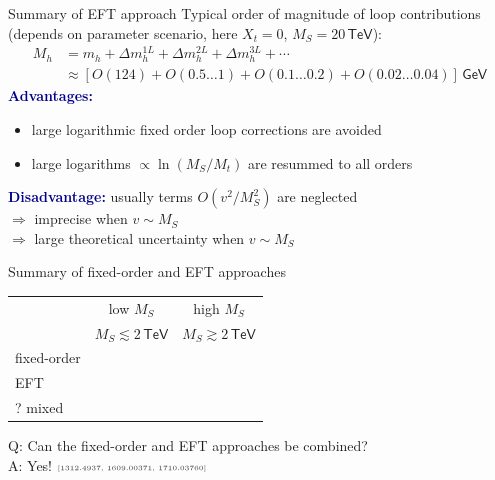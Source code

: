 \documentclass[hyperref={pdfpagelabels=false},ngerman]{beamer}
\newcommand{\cmark}{\ding{51}}%
\newcommand{\xmark}{\ding{55}}%
\newcommand{\eh}[1]{\,\mathsf{#1}}
\newcommand{\ok}{\textcolor{darkgreen}{\cmark}}
\newcommand{\notok}{\textcolor{red}{\xmark}}
\newcommand{\MS}{\ensuremath{M_S}}
\newcommand{\mycite}[1]{\ensuremath{\text{\textcolor{darkgray}{\tiny [#1]}}}}
\renewcommand{\emph}[1]{\textbf{\textcolor{darkblue}{#1}}}
\begin{document}
\begin{frame}{Summary of EFT approach}
  Typical order of magnitude of loop contributions (depends on
  parameter scenario, here $X_t = 0$, $\MS = 20\eh{TeV}$):
  \begin{align*}
    M_h &= m_h + \Delta m_h^{1L} + \Delta m_h^{2L} + \Delta m_h^{3L} + \cdots \\
    &\approx [O(124) + O(0.5\ldots 1) + O(0.1\ldots 0.2) + O(0.02\ldots 0.04)] \eh{GeV}
  \end{align*}
  \emph{Advantages:}
  \begin{itemize}
  \item large logarithmic fixed order loop corrections are avoided
  \item large logarithms $\propto\ln(M_S/M_t)$ are resummed to all orders
  \end{itemize}
  \emph{Disadvantage:} usually terms $O(v^2/M_S^2)$ are neglected \\
  $\Rightarrow$ imprecise when $v \sim \MS$ \\
  $\Rightarrow$ large theoretical uncertainty when $v \sim \MS$
\end{frame}

\begin{frame}{Summary of fixed-order and EFT approaches}
  \begin{center}
    \begin{tabular}{lcc}
      \toprule
                  & low $\MS$ & high $\MS$ \\
                  & $\MS \lesssim 2\eh{TeV}$ & $\MS \gtrsim 2\eh{TeV}$ \\
      \midrule
      fixed-order & \ok       & \notok     \\
      EFT         & \notok    & \ok        \\
      ? mixed     & \ok       & \ok        \\
      \bottomrule
    \end{tabular}
  \end{center}
  \vspace{2em}
  Q: Can the fixed-order and EFT approaches be combined? \\[1em]
  A: Yes!  \mycite{1312.4937, 1609.00371, 1710.03760}
\end{frame}
\end{document}
